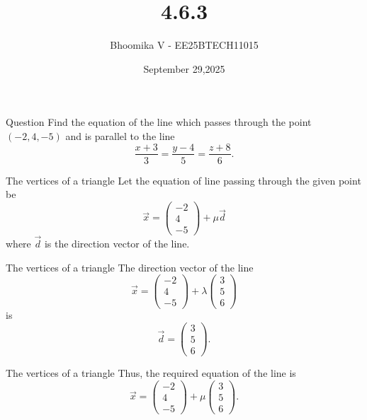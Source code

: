 \documentclass{beamer}
\begin{document}
\title 
{4.6.3}
\date{September 29,2025}


\author 
{Bhoomika V - EE25BTECH11015}




\frame{\titlepage}
\begin{frame}{Question}
Find the equation of the line which passes through the point $(-2,4,-5)$ and is parallel to the line
\[
\frac{x+3}{3} = \frac{y-4}{5} = \frac{z+8}{6}.
\]
\end{frame}

\begin{frame}{The vertices of a triangle}
Let the equation of line passing through the given point be
\[
\vec{x} = 
\begin{pmatrix}
-2 \\ 4 \\ -5
\end{pmatrix}
+ \mu \vec{d}
\]
where $\vec{d}$ is the direction vector of the line.  
\end{frame}


\begin{frame}{The vertices of a triangle}
The direction vector of the line 
\[
\vec{x} = 
\begin{pmatrix}
-2 \\ 4 \\ -5
\end{pmatrix}
+ \lambda
\begin{pmatrix}
3 \\ 5 \\ 6
\end{pmatrix}
\]
is
\[
\vec{d} = 
\begin{pmatrix}
3 \\ 5 \\ 6
\end{pmatrix}.
\tag{1}
\]
\end{frame}


\begin{frame}{The vertices of a triangle}
Thus, the required equation of the line is
\[
\vec{x} =
\begin{pmatrix}
-2 \\ 4 \\ -5
\end{pmatrix}
+ \mu 
\begin{pmatrix}
3 \\ 5 \\ 6
\end{pmatrix}.
\]
\end{frame}
\end{document}
